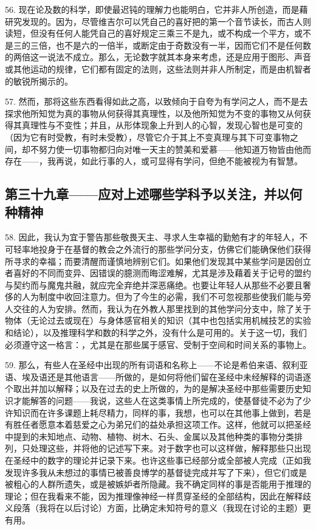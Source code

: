 56. 现在论及数的科学，即使最迟钝的理解力也能明白，它并非人所创造，而是藉研究发现的。因为，尽管维吉尔可以凭自己的喜好把的第一个音节读长，而古人则读短，但没有任何人能凭自己的喜好规定三乘三不是九，或不构成一个平方，或不是三的三倍，也不是六的一倍半，或断定由于奇数没有一半，因而它们不是任何数的两倍这一说法不成立。那么，无论数字就其本身来考虑，还是应用于图形、声音或其他运动的规律，它们都有固定的法则，这些法则并非人所制定，而是由机智者的敏锐所揭示的。\par

57. 然而，那将这些东西看得如此之高，以致倾向于自夸为有学问之人，而不是去探求他所知觉为真的事物从何获得其真理性，以及他所知觉为不变的事物又从何获得其真理性与不变性；并且，从形体现象上升到人的心智，发现心智也是可变的（因为它有时受教，有时未受教），尽管它介于其上不变真理与其下可变事物之间，却不努力使一切事物都归向对唯一天主的赞美和爱慕——他知道万物皆由他而存在——，我再说，如此行事的人，或可显得有学问，但绝不能被视为有智慧。\par


\subsection{第三十九章——应对上述哪些学科予以关注，并以何种精神}

58. 因此，我认为宜于警告那些敬畏天主、寻求人生幸福的勤勉有才的年轻人，不可轻率地投身于在基督的教会之外流行的那些学问分支，仿佛它们能确保他们获得所寻求的幸福；而要清醒而谨慎地辨别它们。如果他们发现其中某些学问是因创立者喜好的不同而变异、因错误的臆测而晦涩难解，尤其是涉及藉着关于记号的盟约与契约而与魔鬼共融，就应完全弃绝并深恶痛绝。也要让年轻人从那些不必要且奢侈的人为制度中收回注意力。但为了今生的必需，我们不可忽视那些使我们能与旁人交往的人为安排。然而，我认为在外教人那里找到的其他学问分支中，除了关于物体（无论过去或现在）与身体感官相关的知识（其中也包括实用机械技艺的实验和结论），以及推理科学和数的科学之外，没有什么是可用的。关于这一切，我们必须遵守这一格言：，尤其是在那些属于感官、受制于空间和时间关系的事物上。\par

59. 那么，有些人在圣经中出现的所有词语和名称上——不论是希伯来语、叙利亚语、埃及语还是其他语言——所做的，是如何将他们留在圣经中未经解释的词语逐个取出并加以解释；以及在过去的史上所做的，为的是解决圣经中那些需要历史知识才能解答的问题——我说，这些人在这类事情上所完成的，使基督徒不必为了少许知识而在许多课题上耗尽精力，同样的事，我想，也可以在其他事上做到，若是有胜任者愿意本着慈爱之心为弟兄们的益处承担这项工作。这样，他就可以把圣经中提到的未知地点、动物、植物、树木、石头、金属以及其他种类的事物分类排列，只处理这些，并将他的记述写下来。对于数字也可以这样做，解释那些只出现在圣经中的数字的理论并记录下来。也许这些事已经部分或全部被人完成（正如我发现许多我从未想过的事情已被善良博学的基督徒完成并写了下来），但它们或是被粗心的人群所遗失，或是被嫉妒者所隐藏。我不确定同样的事是否能用于推理的理论；但在我看来不能，因为推理像神经一样贯穿圣经的全部结构，因此在解释歧义段落（我将在以后讨论）方面，比确定未知符号的意义（我现在讨论的主题）更有用。\par

